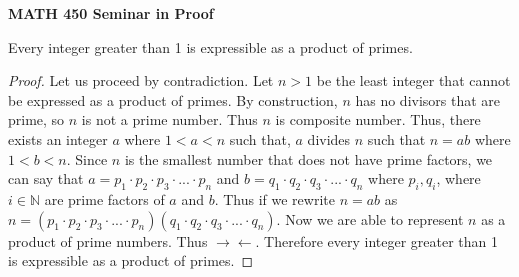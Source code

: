 \documentclass[12pt, fullpage]{article}
\newcommand{\N}{\mathbb N}
\begin{document}
\begin{center}
		
{\bf MATH 450 Seminar in Proof}
 \\
\end{center}
	Every integer greater than 1 is expressible as a product of primes.
\begin{proof}
	Let us proceed by contradiction. Let $n > 1$ be the least integer that cannot be expressed as a product of primes. By construction, $n$ has no divisors that are prime, so $n$ is not a prime number. Thus $n$ is composite number. Thus, there exists an integer $a$ where $1 < a < n$ such that, $a$ divides $n$ such that $n = ab$ where $1<b<n$. Since $n$ is the smallest number that does not have prime factors, we can say that $a = p_1 \cdot p_2 \cdot p_3 \cdot ... \cdot p_n$ and $b = q_1 \cdot q_2 \cdot q_3 \cdot ... \cdot q_n$ where $p_i, q_i$, where $i \in \N$ are prime factors of $a$ and $b$. Thus if we rewrite $n = ab$ as $n = (p_1 \cdot p_2 \cdot p_3 \cdot ... \cdot p_n)(q_1 \cdot q_2 \cdot q_3 \cdot ... \cdot q_n)$. Now we are able to represent $n$ as a product of prime numbers. Thus $\rightarrow\leftarrow$. Therefore every integer greater than 1 is expressible as a product of primes.
\end{proof}
\end{document}
